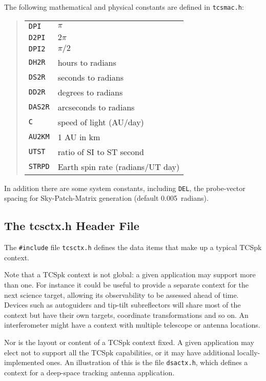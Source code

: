\documentclass[12pt,fleqn,twoside]{article}
\renewcommand{\_}{{\tt\char'137}}     %
\begin{document}
The following mathematical and physical constants are defined
in {\tt tcsmac.h}:
\begin{quote}
\begin{tabular}{ll}
{\tt DPI}   & $\pi$ \\
{\tt D2PI}  & $2\pi$ \\
{\tt DPI2}  & $\pi/2$ \\
{\tt DH2R}  & hours to radians \\
{\tt DS2R}  & seconds to radians \\
{\tt DD2R}  & degrees to radians \\
{\tt DAS2R} & arcseconds to radians \\
{\tt C}     & speed of light (AU/day) \\
{\tt AU2KM} & 1 AU in km \\
{\tt UTST}  & ratio of SI to ST second \\
{\tt STRPD} & Earth spin rate (radians/UT day) \\
\end{tabular}
\end{quote}

In addition there are some system constants, including {\tt DEL}, the
probe-vector spacing for Sky-Patch-Matrix generation
(default 0.005~radians).

\subsection{The tcsctx.h Header File}
\label{tcsctxdoth}

The {\tt \#include} file {\tt tcsctx.h}
defines the data items that make up a typical TCSpk context.

Note that a TCSpk context is not global: a
given application may support more than one.  For instance it
could be useful to provide a
separate context for the next science
target, allowing its observability to be assessed ahead
of time.  Devices such as autoguiders and tip-tilt
subreflectors will share most of the context but have their
own targets, coordinate transformations and so on.  An interferometer
might have a context with multiple telescope or antenna locations.

Nor is the layout or content of a TCSpk context fixed.  A given
application may elect not to support all the TCSpk capabilities, or
it may have additional locally-implemented ones.  An illustration
of this is the file {\tt dsactx.h}, which defines a context for a
deep-space tracking antenna application.
\end{document}
